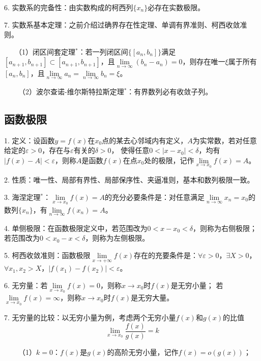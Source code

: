 6. 实数系的完备性：由实数构成的柯西列$\{x_n\}$必存在实数极限。

7. 实数系基本定理：之前介绍过确界存在性定理、单调有界准则、柯西收敛准则。

~~~（1）闭区间套定理$^*$：若一列闭区间$\{\left[a_n,b_n\right]\}$满足$\left[a_{n+1},b_{n+1}\right]\subset \left[a_{n+1},b_{n+1}\right]$，且$\lim\limits_{n\rightarrow \infty}\left(b_n-a_n\right)=0$，则存在唯一$\xi$属于所有$\left[a_n,b_n\right]$，且$\lim\limits_{n\rightarrow \infty}a_n=\lim\limits_{n\rightarrow \infty}b_n=\xi$。

~~~~（2）波尔查诺-维尔斯特拉斯定理$^*$：有界数列必有收敛子列。

\subsection{函数极限}

1. 定义：设函数$y=f(x)$在$x_0$点的某去心邻域内有定义，$A$为实常数，若对任意给定的$\varepsilon>0$，存在与$\varepsilon$有关的$\delta>0$，
使得任意$0<\left|x-x_0\right|<\delta$，均有$|f(x)-A|<\varepsilon$，则称$A$是函数$f(x)$在点$x_0$处的极限，记作$\lim\limits_{x\rightarrow x_0}f(x)=A$。

2. 性质：唯一性、局部有界性、局部保序性、夹逼准则，基本和数列极限一致。

3. 海涅定理$^*$：$\lim\limits_{x\rightarrow x_0}f(x)=A$的充分必要条件是：对任意满足$\lim\limits_{n \rightarrow \infty}x_n=x_0$的数列$\{x_n\}$，有$\lim\limits_{n \rightarrow \infty}f\left(x_n\right)=A$。

4. 单侧极限：在函数极限定义中，若范围改为$0<x-x_0<\delta$，则称为右侧极限；若范围改为$0<x_0-x<\delta$，则称为左侧极限。

5. 柯西收敛准则：函数极限$\lim\limits_{x\rightarrow +\infty} f(x)$存在的充要条件是：$\forall \varepsilon>0$，$\exists X>0$，$\forall x_1,x_2>X$，$\left|f(x_1)-f(x_2)\right|<\varepsilon$。

6. 无穷量：若$\lim\limits_{x\rightarrow x_0}f(x)=0$，则称$x\rightarrow x_0$时$f(x)$是无穷小量；
若$\lim\limits_{x\rightarrow x_0}f(x)=\infty$，则称$x\rightarrow x_0$时$f(x)$是无穷大量。

7. 无穷量的比较：以无穷小量为例，考虑两个无穷小量$f(x)$和$g(x)$的比值
\begin{equation*}
    \lim\limits_{x\rightarrow x_0}\frac{f(x)}{g(x)}=k
\end{equation*}

~~~~（1）$k=0$：$f(x)$是$g(x)$的高阶无穷小量，记作$f(x)=o\left(g(x)\right)$；

